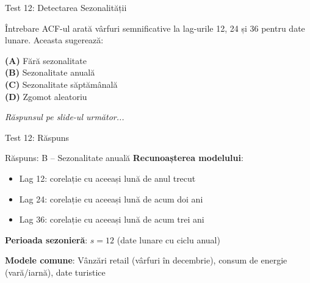 \documentclass[9pt, aspectratio=169, t]{beamer}
\begin{document}
\begin{frame}{Test 12: Detectarea Sezonalității}
    \begin{alertblock}{Întrebare}
        ACF-ul arată vârfuri semnificative la lag-urile 12, 24 și 36 pentru date lunare. Aceasta sugerează:
    \end{alertblock}

    \vspace{0.4cm}

    \textcolor{MainBlue}{\textbf{(A)}} Fără sezonalitate\\[3pt]
    \textcolor{MainBlue}{\textbf{(B)}} Sezonalitate anuală\\[3pt]
    \textcolor{MainBlue}{\textbf{(C)}} Sezonalitate săptămânală\\[3pt]
    \textcolor{MainBlue}{\textbf{(D)}} Zgomot aleatoriu

    \vspace{0.5cm}

    \begin{center}
        \textit{Răspunsul pe slide-ul următor...}
    \end{center}
\end{frame}

\begin{frame}{Test 12: Răspuns}
    \begin{exampleblock}{Răspuns: B -- Sezonalitate anuală}
        \textbf{Recunoașterea modelului}:
        \begin{itemize}
            \item Lag 12: corelație cu aceeași lună de anul trecut
            \item Lag 24: corelație cu aceeași lună de acum doi ani
            \item Lag 36: corelație cu aceeași lună de acum trei ani
        \end{itemize}

        \textbf{Perioada sezonieră}: $s = 12$ (date lunare cu ciclu anual)

        \textbf{Modele comune}: Vânzări retail (vârfuri în decembrie), consum de energie (vară/iarnă), date turistice
    \end{exampleblock}
\end{frame}
\end{document}
